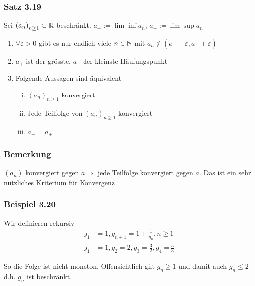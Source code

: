 \subsubsection*{Satz 3.19}
Sei $\left( a_n\right)_{n\geq 1}\subset\mathbb{R}$ beschränkt. $a_{-}:=\lim\inf a_n$, $a_+:=\lim\sup a_n$
\begin{enumerate}
\item $\forall\varepsilon > 0$ gibt es nur endlich viele $n\in\mathbb{N}$ mit $a_n\not\in\left( a_- -\varepsilon,a_+ +\varepsilon\right)$
\item $a_+$ ist der grösste, $a_-$ der kleinste Häufungspunkt
\item Folgende Aussagen sind äquivalent
\begin{enumerate}[(i)]
\item $\left( a_n\right)_{n\geq 1}$ konvergiert
\item Jede Teilfolge von $\left( a_n\right)_{n\geq 1}$ konvergiert
\item $a_-=a_+$
\end{enumerate}
\end{enumerate}
\subsubsection*{Bemerkung}
$\left( a_n\right)$ konvergiert gegen $a\Rightarrow$ jede Teilfolge konvergiert gegen $a$. Das ist ein sehr nutzliches Kriterium für Konvergenz

\subsubsection*{Beispiel 3.20}
Wir definieren rekursiv
\begin{align*}
g_1&=1, g_{n+1}=1+\frac{1}{g_n}, n\geq 1\\
g_1&=1, g_2=2, g_3=\frac{3}{2}, g_4=\frac{5}{3}
\end{align*}
\begin{center}
\end{center}
So die Folge ist nicht monoton. Offensichtlich gilt $g_n\geq 1$ und damit auch $g_n\leq 2$ d.h. $g_n$ ist beschränkt.\\

